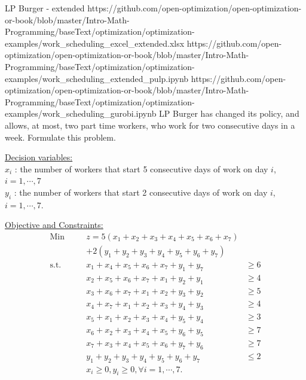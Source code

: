 \newpage
\begin{examplewithallcode}{LP Burger - extended}
{https://github.com/open-optimization/open-optimization-or-book/blob/master/Intro-Math-Programming/baseText/optimization/optimization-examples/work_scheduling_excel_extended.xlsx}
{https://github.com/open-optimization/open-optimization-or-book/blob/master/Intro-Math-Programming/baseText/optimization/optimization-examples/work_scheduling_extended_pulp.ipynb}
{https://github.com/open-optimization/open-optimization-or-book/blob/master/Intro-Math-Programming/baseText/optimization/optimization-examples/work_scheduling_gurobi.ipynb}
LP Burger has changed its policy, and allows, at most, two part time workers, who work for two consecutive days in a week.  Formulate this problem.
\end{examplewithallcode}
\begin{solution}
\underline{Decision variables:} \\
$x_i$ : the number of workers that start 5 consecutive days of work on day $i$, $ i = 1,\cdots,7$ \\
$y_i$ : the number of workers that start 2 consecutive days of work on day $i$, $ i = 1,\cdots,7$.

\smallskip \underline{Objective and Constraints:}
\begin{align*}
\mbox{Min~~ } && z = 5(x_1 + x_2 + x_3 + x_4 + x_5 + x_6 + x_7) \\
&& + 2(y_1 + y_2 + y_3 + y_4 + y_5 + y_6 + y_7) \nonumber \\
\mbox{s.t.~~} && x_1 + x_4 + x_5 + x_6 + x_7 + y_1 + y_7 &\ge 6 \\
&& x_2 + x_5 + x_6 + x_7 + x_1 + y_2 + y_1 &\ge 4 \\
&&           x_3 + x_6 + x_7 + x_1 + x_2 + y_3 + y_2 &\ge 5 \\
&&           x_4 + x_7 + x_1 + x_2 + x_3 + y_4 + y_3 &\ge 4 \\
&&           x_5 + x_1 + x_2 + x_3 + x_4 + y_5 + y_4 &\ge 3 \\
&&           x_6 + x_2 + x_3 + x_4 + x_5 + y_6 + y_5 &\ge 7 \\
&&           x_7 + x_3 + x_4 + x_5 + x_6 + y_7 + y_6 &\ge 7 \\
&&           y_1 + y_2 + y_3 + y_4 + y_5 + y_6 + y_7 &\le 2 \\
&&           x_i \ge 0, y_i \ge 0, \forall i = 1,\cdots,7.
\end{align*}
\end{solution}




